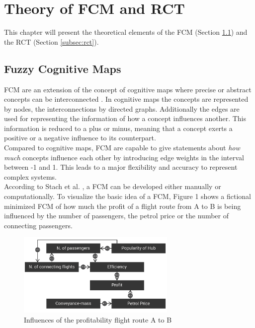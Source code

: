 \documentclass[conference]{IEEEtran}
\begin{document}
\section{Theory of FCM and RCT}
\label{sec:theory}
This chapter will present the theoretical elements of the FCM (Section \ref{subsec:fcm}) and the RCT (Section \ref{subsec:rct}).
\subsection{Fuzzy Cognitive Maps}
\label{subsec:fcm}

FCM are an extension of the concept of cognitive maps where precise or abstract concepts can be interconnected \cite{kosko1986}. In cognitive maps the concepts are represented by nodes, the interconnections by directed graphs. Additionally the edges are used for representing the information of how a concept influences another. This information is reduced to a plus or minus, meaning that a concept exerts a positive or a negative influence to its counterpart.\\
Compared to cognitive maps, FCM are capable to give statements about \emph{how much} concepts influence each other by introducing edge weights in the interval between -1 and 1. This leads to a major flexibility and accuracy to represent complex systems.\\
According to Stach et al. \cite{stach2005}, a FCM can be developed either manually or computationally. To visualize the basic idea of a FCM, Figure 1 shows a fictional minimized FCM of how much the profit of a flight route from A to B is being influenced by the number of passengers, the petrol price or the number of connecting passengers.

\begin{figure}[ht]
\includegraphics[width=3in]{img/ficFCM.png}
\caption{Influences of the profitability flight route A to B}
\label{fig:cm}
\end{figure}
\end{document}
